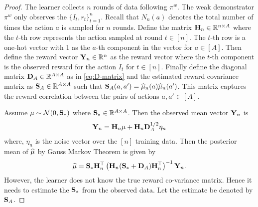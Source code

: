 \begin{proof}
The learner collects $n$ rounds of data following $\pi^w$. The weak demonstrator $\pi^w$ only observes the $\{I_t, r_t\}_{t=1}^n$. Recall that $N_n(a)$ denotes the total number of times the action $a$ is sampled for $n$ rounds. 
%
%
Define the matrix $\mathbf{H}_n \in \mathbb{R}^{n \times A}$ where the $t$-th row represents the action sampled at round $t\in [n]$. 
%
The $t$-th row is a one-hot vector with $1$ as the $a$-th component in the vector for $a\in [A]$.
%
Then define the reward vector $\mathbf{Y}_n \in \mathbb{R}^n$ as the reward vector where the $t$-th component is the observed reward for the action $I_t$ for $t\in [n]$.
%
Finally define the diagonal matrix $\mathbf{D}_A\in\mathbb{R}^{A\times A}$ as in \eqref{eq:D-matrix} and the estimated reward covariance matrix as $\mathbf{S}_A\in\mathbb{R}^{A\times A}$ such that $\mathbf{S}_A(a,a') = \widehat{\mu}_n(a)\widehat{\mu}_n(a')$. This matrix captures the reward correlation between the pairs of actions $a,a'\in [A]$.

%
Assume $\mu\sim\mathcal{N}(0, \mathbf{S}_*)$ where $\mathbf{S}_*\in\mathbb{R}^{A\times A}$. Then the observed mean vector $\mathbf{Y}_n$ is 
\begin{align*}
    \mathbf{Y}_n = \mathbf{H}_n \mu + \mathbf{H}_n \mathbf{D}_A^{1/2} \eta_n
\end{align*}
where, $\eta_n$ is the noise vector over the $[n]$ training data. Then the posterior mean of $\widehat{\mu}$ by Gauss Markov Theorem \citep{johnson2002applied} is given by
\begin{align}
    \widehat{\mu} = \mathbf{S}_*\mathbf{H}_n^\top\left(\mathbf{H}_n(\mathbf{S}_* + \mathbf{D}_A)\mathbf{H}_n^\top\right)^{-1}\mathbf{Y}_n. \label{eq:posterior}
\end{align}
However, the learner does not know the true reward co-variance matrix. Hence it needs to estimate the $\mathbf{S}_*$ from the observed data. Let the estimate be denoted by $\mathbf{S}_A$. 


\end{proof}

